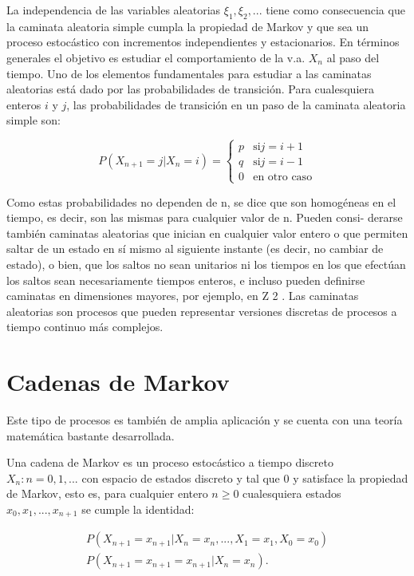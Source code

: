 La independencia de las variables aleatorias $\xi_1, \xi_2,...$ tiene como
consecuencia que la caminata aleatoria simple cumpla la propiedad de Markov y
que sea un proceso estocástico con incrementos independientes y estacionarios.
En términos generales el objetivo es estudiar el comportamiento de la v.a. $X_n$
al paso del tiempo. Uno de los elementos fundamentales para estudiar a las
caminatas aleatorias está dado por las probabilidades de transición. Para
cualesquiera enteros $i$ y $j$, las probabilidades de transición en un paso de
la caminata aleatoria simple son:

\begin{equation}
    P(X_{n+1}=j | X_n = i) = \left\lbrace \begin{array}{ll}
        p & \text{si} j = i+1 \\
        q & \text{si} j = i-1 \\
        0 & \text{en otro caso}
    \end{array}\right.
\end{equation}

Como estas probabilidades no dependen de n, se dice que son homogéneas en el
tiempo, es decir, son las mismas para cualquier valor de n. Pueden consi-
derarse también caminatas aleatorias que inician en cualquier valor entero o que
permiten saltar de un estado en sí mismo al siguiente instante (es decir, no
cambiar de estado), o bien, que los saltos no sean unitarios ni los tiempos en
los que efectúan los saltos sean necesariamente tiempos enteros, e incluso
pueden definirse caminatas en dimensiones mayores, por ejemplo, en Z 2 . Las
caminatas aleatorias son procesos que pueden representar versiones discretas de
procesos a tiempo continuo más complejos.

\section{Cadenas de Markov}

Este tipo de procesos es también de amplia aplicación y se cuenta con una teoría
matemática bastante desarrollada. \\

\begin{tcolorbox}[colback=gray!5!white,colframe=gray!60!black,title=Cadenas de Markov]
Una cadena de Markov es un proceso estocástico a tiempo discreto ${X_n : n=0,
1,...}$ con espacio de estados discreto y tal que 0 y satisface la propiedad de
Markov, esto es, para cualquier entero $n \geq 0$ cualesquiera estados $x_0 , x_1 , . . .
, x_{n+1}$ se cumple la identidad:

\begin{equation}
    \begin{array}{l}
    P(X_{n+1} =  x_{n+1} | X_n = x_n, ..., X_1 = x_1, X_0=x_0) \\
    P(X_{n+1} = x_{n+1} = x_{n+1} | X_n = x_n).
    \end{array}
\end{equation}

\end{tcolorbox} 


